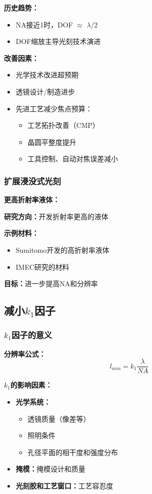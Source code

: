 \documentclass[UTF8,12pt,a4paper]{ctexart}
\begin{document}
\textbf{历史趋势：}
\begin{itemize}
    \item NA接近1时，DOF $\approx$ $\lambda$/2
    \item DOF缩放主导光刻技术演进
\end{itemize}

\textbf{改善因素：}
\begin{itemize}
    \item 光学技术改进超预期
    \item 透镜设计/制造进步
    \item 先进工艺减少焦点预算：
    \begin{itemize}
        \item 工艺拓扑改善（CMP）
        \item 晶圆平整度提升
        \item 工具控制、自动对焦误差减小
    \end{itemize}
\end{itemize}

\subsubsection{扩展浸没式光刻}

\textbf{更高折射率液体：}

\textbf{研究方向：}开发折射率更高的液体

\textbf{示例材料：}
\begin{itemize}
    \item Sumitomo开发的高折射率液体
    \item IMEC研究的材料
\end{itemize}

\textbf{目标：}进一步提高NA和分辨率

\subsection{减小$k_1$因子}

\subsubsection{$k_1$因子的意义}

\textbf{分辨率公式：}
\begin{equation}
l_{min} = k_1 \frac{\lambda}{NA}
\end{equation}

\textbf{$k_1$的影响因素：}
\begin{itemize}
    \item \textbf{光学系统：}
    \begin{itemize}
        \item 透镜质量（像差等）
        \item 照明条件
        \item 孔径平面的相干度和强度分布
    \end{itemize}
    \item \textbf{掩模：}掩模设计和质量
    \item \textbf{光刻胶和工艺窗口：}工艺容忍度
\end{itemize}
\end{document}
